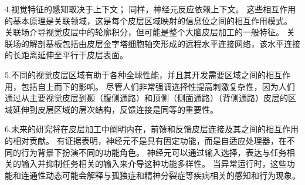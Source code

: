4.视觉特征的感知取决于上下文；
同样，神经元反应依赖上下文。
这些相互作用的基本原理是关联领域，这是每个皮层区域映射的信息位之间的相互作用模式。
关联场介导视觉皮层中的轮廓积分，但可能是整个大脑皮层加工的一般特征。
关联场的解剖基板包括由皮层金字塔细胞轴突形成的远程水平连接网络，该水平连接的长距离延伸至平行于皮层表面。 


5.不同的视觉皮层区域有助于各种全球性能，并且其开发需要区域之间的相互作用，包括自上而下的影响。
尽管人们非常强调选择性提高刺激复杂性，因为人们通过从主要视觉皮层到颞（腹侧通路）和顶侧（侧面通路）（背侧通路）皮层的区域延伸到皮层区域的层次结构，反馈连接是同等的重要性。 


6.未来的研究将在皮层加工中阐明内在，前馈和反馈皮层连接及其之间的相互作用的相对贡献。
有证据表明，神经元不是具有固定功能，而是自适应处理器，在不同的行为背景下扮演不同的功能角色。
神经元可以通过输入选择，表达与任务相关的输入并抑制任务相关的输入来介导这种功能多样性。
当异常运行时，这些功能和连通性动态可能会解释与孤独症和精神分裂症等疾病相关的感知和行为现象。

